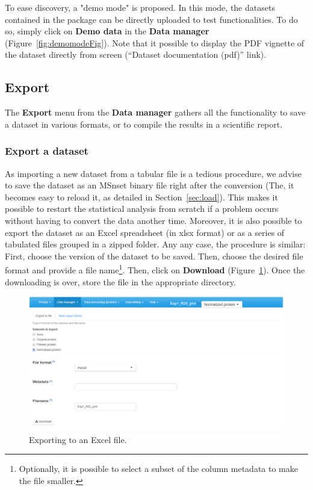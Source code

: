 \documentclass[12pt]{article}
\begin{document}
To ease  discovery, a "demo mode" is proposed. In this mode, 
the datasets contained in the package  can be directly uploaded to test
 functionalities. To do so, 
simply click on \textbf{Demo data} in the \textbf{Data manager} (Figure~\ref{fig:demomodeFig}).
Note that it possible to display the PDF vignette of the dataset directly from  screen (``Dataset documentation (pdf)'' link).

\subsection{Export} \label{sec:export}
The \textbf{Export} menu from the \textbf{Data manager} gathers all the functionality to save a dataset in various formats, or to compile the results in a scientific report.

\subsubsection{Export a dataset} 
As importing a new dataset from a tabular file is a tedious procedure, we advise to save the dataset as an MSnset binary file right after the conversion (The, it becomes easy to reload it, as detailed in Section~\ref{sec:load}). This makes it possible to restart the statistical analysis from scratch if a problem occurs without having to convert the data another time. Moreover, it is also possible to export the dataset as an Excel spreadsheet (in xlsx format) or as a series of tabulated files grouped in a zipped folder. Any any case, the procedure is similar: 
First, choose the version of the dataset to be saved. Then, choose the desired file format and provide a file name\footnote{Optionally, it is possible to select a subset of the column metadata to make the file smaller.}. Then, click on \textbf{Download} (Figure~\ref{fig:export}). Once the downloading is over, store the file in the appropriate directory.


\begin {figure}
\includegraphics[width=\textwidth]{images/export.png}
\caption{Exporting to an Excel file.}\label{fig:export}
\end {figure}
\end{document}
